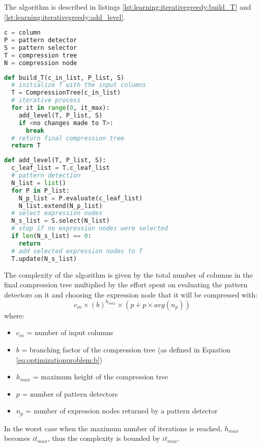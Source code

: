 The algorithm is described in listings \ref{lst:learning:iterativegreedy:build_T} and \ref{lst:learning:iterativegreedy:add_level}.

\begin{lstlisting}[language=Python,
label={lst:learning:iterativegreedy:naming},
caption={Naming conventions}]
c = column
P = pattern detector
S = pattern selector
T = compression tree
N = compression node
\end{lstlisting}

\begin{lstlisting}[language=Python,
label={lst:learning:iterativegreedy:build_T},
caption={build\_T (iterative greedy)}]
def build_T(c_in_list, P_list, S)
  # initialize T with the input columns
  T = CompressionTree(c_in_list)
  # iterative process
  for it in range(0, it_max):
    add_level(T, P_list, S)
    if <no changes made to T>:
      break
  # return final compression tree
  return T
\end{lstlisting}
\bigskip

\begin{lstlisting}[language=Python,
label={lst:learning:iterativegreedy:add_level},
caption={add\_level (iterative greedy)}]
def add_level(T, P_list, S):
  c_leaf_list = T.c_leaf_list
  # pattern detection 
  N_list = list()
  for P in P_list:
    N_p_list = P.evaluate(c_leaf_list)
    N_list.extend(N_p_list)
  # select expression nodes
  N_s_list = S.select(N_list)
  # stop if no expression nodes were selected
  if len(N_s_list) == 0:
    return
  # add selected expression nodes to T
  T.update(N_s_list)
\end{lstlisting}
\bigskip

The complexity of the algorithm is given by the total number of columns in the final compression tree multiplied by the effort spent on evaluating the pattern detectors on it and choosing the expression node that it will be compressed with:
\begin{equation}
\label{eq:learning:recursiveexhaustive}
    c_{in} \times (b) ^ {h_{max}} \times (p + p \times \mathit{avg}(n_{p}))
\end{equation}
where:
\begin{itemize}
    \item[] \(c_{in}\) = number of input columns
    \item[] \(b\) = branching factor of the compression tree (as defined in Equation \ref{eq:optimizationproblem:b})
    \item[] \(h_{max}\) = maximum height of the compression tree
    \item[] \(p\) = number of pattern detectors
    \item[] \(n_{p}\) = number of expression nodes returned by a pattern detector
\end{itemize}
In the worst case when the maximum number of iterations is reached, \(h_{max}\) becomes \(it_{max}\), thus the complexity is bounded by \(it_{max}\).

